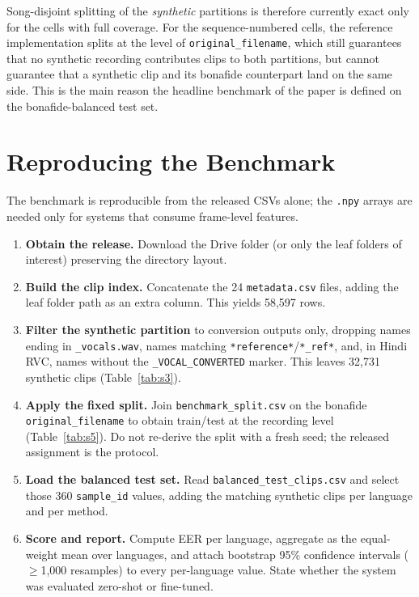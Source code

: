 \documentclass[conference]{IEEEtran}
\begin{document}

Song-disjoint splitting of the \emph{synthetic} partitions is therefore currently exact
only for the cells with full coverage. For the sequence-numbered cells, the reference
implementation splits at the level of \texttt{original\_filename}, which still guarantees
that no synthetic recording contributes clips to both partitions, but cannot guarantee
that a synthetic clip and its bonafide counterpart land on the same side. This is the
main reason the headline benchmark of the paper is defined on the bonafide-balanced test
set.

\section{Reproducing the Benchmark}
\label{sec:repro}
The benchmark is reproducible from the released CSVs alone; the \texttt{.npy} arrays are
needed only for systems that consume frame-level features.

\begin{enumerate}
  \item \textbf{Obtain the release.} Download the Drive folder (or only the leaf folders
        of interest) preserving the directory layout.
  \item \textbf{Build the clip index.} Concatenate the 24 \texttt{metadata.csv} files,
        adding the leaf folder path as an extra column. This yields 58{,}597 rows.
  \item \textbf{Filter the synthetic partition} to conversion outputs only, dropping
        names ending in \texttt{\_vocals.wav}, names matching
        \texttt{*reference*}/\texttt{*\_ref*}, and, in Hindi RVC, names without the
        \texttt{\_VOCAL\_CONVERTED} marker. This leaves 32{,}731 synthetic clips
        (Table~\ref{tab:s3}).
  \item \textbf{Apply the fixed split.} Join \texttt{benchmark\_split.csv} on the
        bonafide \texttt{original\_filename} to obtain train/test at the recording level
        (Table~\ref{tab:s5}). Do not re-derive the split with a fresh seed; the released
        assignment is the protocol.
  \item \textbf{Load the balanced test set.} Read
        \texttt{balanced\_test\_clips.csv} and select those 360 \texttt{sample\_id}
        values, adding the matching synthetic clips per language and per method.
  \item \textbf{Score and report.} Compute EER per language, aggregate as the
        equal-weight mean over languages, and attach bootstrap 95\% confidence intervals
        ($\geq$1{,}000 resamples) to every per-language value. State whether the system
        was evaluated zero-shot or fine-tuned.
\end{enumerate}
\end{document}
